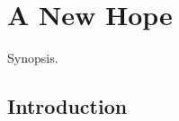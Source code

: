 \chapter{A New Hope}

\graphicspath{{figures/chapter-5/}}


\begin{synopsis}
	Synopsis.
\end{synopsis}


\section{Introduction}

\lipsum[1]
\cite{Salmon2006}

